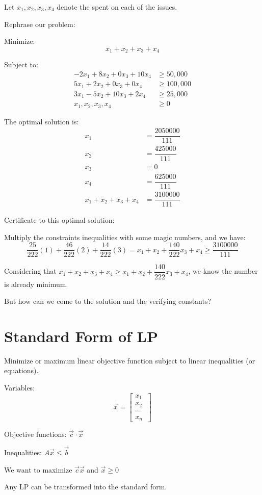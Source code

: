 Let \(x_1, x_2, x_3, x_4\) denote the spent on each of the issues. 

Rephrase our problem:

Minimize:
\[
    x_1 + x_2 + x_3 + x_4
\]

Subject to:
\begin{align}
    -2x_1 + 8x_2 + 0x_3 + 10x_4 &\geq 50,000 \tag{Urban Majority  (1)} \\
    5x_1 + 2x_2 + 0x_3 + 0x_4 &\geq 100,000 \tag{Suburban Majority (2)}  \\
    3x_1 - 5x_2 + 10x_3 + 2x_4 &\geq 25,000 \tag{Rural Majority (3)} \\
    x_1, x_2, x_3, x_4 &\geq 0 \tag{Can't unadvertise}
\end{align}

The optimal solution is:
\begin{align}
    x_1 &= \dfrac{2050000}{111} \\
    x_2 &= \dfrac{425000}{111} \\
    x_3 &= 0 \\
    x_4 &= \dfrac{625000}{111} \\ 
    x_1 + x_2 + x_3 + x_4 &= \dfrac{3100000}{111}
\end{align}

Certificate to this optimal solution:

Multiply the constraints inequalities with some magic numbers, and we have:
\[
    \dfrac{25}{222} (1) + \dfrac{46}{222} (2) + \dfrac{14}{222} (3) 
    =
    x_1 + x_2 + \dfrac{140}{222} x_3 + x_4
    \geq
    \dfrac{3100000}{111}
\]

Considering that \(x_1 + x_2 + x_3 + x_4 \geq x_1 + x_2 + \dfrac{140}{222} x_3 + x_4\), we know the number is already minimum. 

But how can we come to the solution and the verifying constants?

\section{Standard Form of LP}
\begin{definition}
    Minimize or maximum linear objective function subject to linear inequalities (or equations).

    Variables:
    \[
        \vec{x} = \begin{bmatrix}
             x_1 \\
             x_2 \\
             \cdots \\
             x_n \
        \end{bmatrix}
    \]

    Objective functions: \(\vec{c}  \cdot \vec{x} \) 

    Inequalities: \(A \vec{x} \leq \vec{b}\) 

    We want to maximize \(\vec{c} \vec{x} \) and \(\vec{x} \geq 0\)  
    \begin{remark}
        Any LP can be transformed into the standard form.
    \end{remark}
\end{definition}

